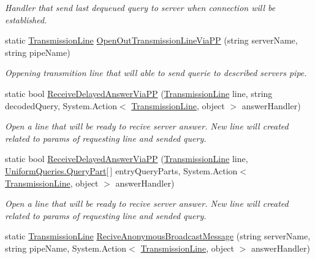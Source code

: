 \begin{DoxyCompactItemize}
\begin{DoxyCompactList}\small\item\em Handler that send last dequeued query to server when connection will be established. \end{DoxyCompactList}\item 
static \mbox{\hyperlink{class_pipes_provider_1_1_client_1_1_transmission_line}{Transmission\+Line}} \mbox{\hyperlink{class_uniform_client_1_1_base_client_a56ba8d0360e3c65a69d2d69db878ec23}{Open\+Out\+Transmission\+Line\+Via\+PP}} (string server\+Name, string pipe\+Name)
\begin{DoxyCompactList}\small\item\em Oppening transmition line that will able to send querie to described server\textquotesingle{}s pipe. \end{DoxyCompactList}\item 
static bool \mbox{\hyperlink{class_uniform_client_1_1_base_client_aa6a13dcf0a4dbefd681cf7eb333813aa}{Receive\+Delayed\+Answer\+Via\+PP}} (\mbox{\hyperlink{class_pipes_provider_1_1_client_1_1_transmission_line}{Transmission\+Line}} line, string decoded\+Query, System.\+Action$<$ \mbox{\hyperlink{class_pipes_provider_1_1_client_1_1_transmission_line}{Transmission\+Line}}, object $>$ answer\+Handler)
\begin{DoxyCompactList}\small\item\em Open a line that will be ready to recive server answer. New line will created related to params of requesting line and sended query. \end{DoxyCompactList}\item 
static bool \mbox{\hyperlink{class_uniform_client_1_1_base_client_a4db768d7c09862ab9adc9d7b0638edc6}{Receive\+Delayed\+Answer\+Via\+PP}} (\mbox{\hyperlink{class_pipes_provider_1_1_client_1_1_transmission_line}{Transmission\+Line}} line, \mbox{\hyperlink{struct_uniform_queries_1_1_query_part}{Uniform\+Queries.\+Query\+Part}}\mbox{[}$\,$\mbox{]} entry\+Query\+Parts, System.\+Action$<$ \mbox{\hyperlink{class_pipes_provider_1_1_client_1_1_transmission_line}{Transmission\+Line}}, object $>$ answer\+Handler)
\begin{DoxyCompactList}\small\item\em Open a line that will be ready to recive server answer. New line will created related to params of requesting line and sended query. \end{DoxyCompactList}\item 
static \mbox{\hyperlink{class_pipes_provider_1_1_client_1_1_transmission_line}{Transmission\+Line}} \mbox{\hyperlink{class_uniform_client_1_1_base_client_a97a86c4f5931d39e09ce7c9d336a1636}{Recive\+Anonymous\+Broadcast\+Message}} (string server\+Name, string pipe\+Name, System.\+Action$<$ \mbox{\hyperlink{class_pipes_provider_1_1_client_1_1_transmission_line}{Transmission\+Line}}, object $>$ answer\+Handler)

\end{DoxyCompactItemize}
